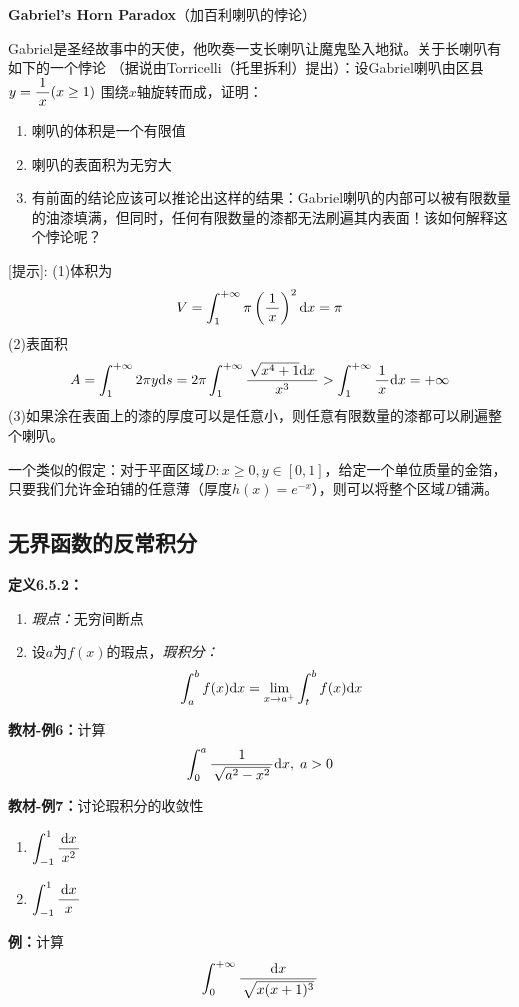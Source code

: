 \begin{shaded}
	{\bf Gabriel's Horn Paradox}（加百利喇叭的悖论）
	
	Gabriel是圣经故事中的天使，他吹奏一支长喇叭让魔鬼坠入地狱。关于长喇叭有如下的一个悖论
	（据说由Torricelli（托里拆利）提出）：设Gabriel喇叭由区县$y=\displaystyle\frac{\,{1}\,}{\,{x}\,}(x\geq 1)$
	围绕$x$轴旋转而成，证明：
	\begin{enumerate} [(1)]
  	  \setlength{\itemindent}{1cm}
	  \item 喇叭的体积是一个有限值
	  \item 喇叭的表面积为无穷大
	  \item 有前面的结论应该可以推论出这样的结果：Gabriel喇叭的内部可以被有限数量
	  的油漆填满，但同时，任何有限数量的漆都无法刷遍其内表面！该如何解释这个悖论呢？
	\end{enumerate}
	[提示]:
	(1)体积为
	$$V=\displaystyle\int_1^{+\infty}\pi\left(\displaystyle\frac{\,{1}\,}{\,{x}\,}\right)^2\mathrm{d} x=\pi$$
	(2)表面积
	$$A=\displaystyle\int_1^{+\infty}2\pi y\mathrm{d} s=2\pi\displaystyle\int_1^{+\infty}
	\displaystyle\frac{\,{\sqrt{x^4+1}\mathrm{d} x}\,}{\,{x^3}\,}>\displaystyle\int_1^{+\infty}\displaystyle\frac{\,{1}\,}{\,{x}\,}\mathrm{d} x=+\infty$$
	(3)如果涂在表面上的漆的厚度可以是任意小，则任意有限数量的漆都可以刷遍整个喇叭。
	
	一个类似的假定：对于平面区域$D:x\geq0,y\in[0,1]$，给定一个单位质量的金箔，
	只要我们允许金珀铺的任意薄（厚度$h(x)=e^{-x}$），则可以将整个区域$D$铺满。
\end{shaded}

\subsection{无界函数的反常积分}

{\bf 定义6.5.2：}
\begin{enumerate} [(1)]
  \setlength{\itemindent}{1cm}
  \item {\it 瑕点：}无穷间断点 
  \item 设$a$为$f(x)$的瑕点，{\it 瑕积分：}
  $$\displaystyle\int_a^bf(x)\mathrm{d} x=\lim\limits_{x\to{a^+}}\displaystyle\int_t^bf(x)\mathrm{d} x$$
\end{enumerate}

{\bf 教材-例6：}计算
$$\displaystyle\int_0^a\displaystyle\frac{\,{1}\,}{\,{\sqrt{a^2-x^2}}\,}\mathrm{d} x,\;a>0$$

{\bf 教材-例7：}讨论瑕积分的收敛性
\begin{enumerate}[(1)]
  \setlength{\itemindent}{1cm}
  \item $\displaystyle\int_{-1}^1\displaystyle\frac{\,{\mathrm{d} x}\,}{\,{x^2}\,}$ 
  \item $\displaystyle\int_{-1}^1\displaystyle\frac{\,{\mathrm{d} x}\,}{\,{x}\,}$
\end{enumerate}

{\bf 例：}计算
$$\displaystyle\int_0^{+\infty}\displaystyle\frac{\,{\mathrm{d} x}\,}{\,{\sqrt{x(x+1)^3}}\,}$$

